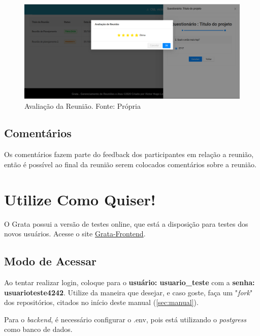 \begin{figure}[H]
    \centering
    \includegraphics[width=1.0\textwidth]{figuras/avaliacao_reuniao.png}
    \caption{Avaliação da Reunião. Fonte: Própria}
    \label{img:avaliacao_reuniao}
\end{figure}

\subsection{Comentários}

Os comentários fazem parte do feedback dos participantes em relação a reunião, então é possível ao final da reunião serem colocados comentários sobre a reunião.

\section{Utilize Como Quiser!}

O Grata possui a versão de testes online, que está a disposição para testes dos novos usuários. Acesse o site \href{https://grata-frontend.herokuapp.com/}{Grata-Frontend}.

\subsection{Modo de Acessar}

Ao tentar realizar login, coloque para o  \textbf{usuário: usuario\_teste} com a \textbf{senha: usuarioteste4242}. Utilize da maneira que desejar, e caso goste, faça um "\textit{fork}" dos repositórios, citados no início deste manual (\ref{sec:manual}).

Para o \textit{backend}, é necessário configurar o .env, pois está utilizando o \textit{postgress} como banco de dados.